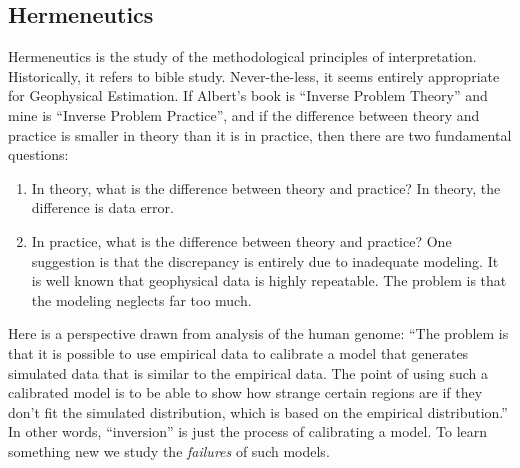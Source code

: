 \subsection{Hermeneutics}
\par
Hermeneutics is the
study of the methodological principles of interpretation.
Historically, it refers to bible study.
Never-the-less, it seems entirely appropriate for Geophysical Estimation.
If Albert's book is ``Inverse Problem Theory'' and mine is
``Inverse Problem Practice'', and if
the difference between theory and practice is smaller in theory
than it is in practice,
then there are two fundamental questions:
\begin{enumerate}
\item In theory, what is the difference between theory and practice?
	In theory, the difference is data error.
\item In practice, what is the difference between theory and practice?
	One suggestion is that the discrepancy is entirely due
	to inadequate modeling.
	It is well known that geophysical data is highly repeatable.
	The problem is that the modeling neglects far too much.
\end{enumerate}

\par
Here is a perspective drawn from analysis of the human genome:
``The problem is that
it is possible to use empirical data to calibrate a model
that generates simulated data that
is similar to the empirical data.
The point of using such a calibrated model
is to be able to show how strange certain regions are
if they don't fit the simulated distribution,
which is based on the empirical distribution.''
In other words, ``inversion'' is just the process of calibrating a model.
To learn something new we study the {\it failures} of such models.



\clearpage

